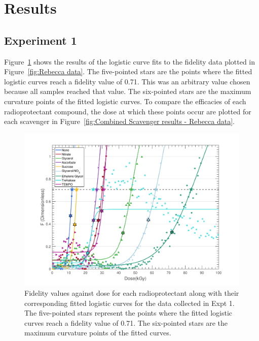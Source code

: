 \section{Results}
\label{sec:Results}

\subsection{Experiment 1}
\label{sub:Experiment 1 - Results}
Figure~\ref{fig:Main radioprotectant plot - Rebecca data} shows the results of the logistic curve fits to the fidelity data plotted in Figure~\ref{fig:Rebecca data}.
The five-pointed stars are the points where the fitted logistic curves reach a fidelity value of 0.71.
This was an arbitrary value chosen because all samples reached that value.
The six-pointed stars are the maximum curvature points of the fitted logistic curves.
To compare the efficacies of each radioprotectant compound, the dose at which these points occur are plotted for each scavenger in Figure~\ref{fig:Combined Scavenger results - Rebecca data}.

\begin{figure}
    \centering
    \includegraphics[width=1.0\textwidth]{figures/saxs/ScavengerPlot.pdf}
    \caption[Fidelity values as a function of dose for each radioprotectant]{Fidelity values against dose for each radioprotectant along with their corresponding fitted logistic curves for the data collected in Expt 1.
    The five-pointed stars represent the points where the fitted logistic curves reach a fidelity value of 0.71.
    The six-pointed stars are the maximum curvature points of the fitted curves.}
    \label{fig:Main radioprotectant plot - Rebecca data}
\end{figure}

